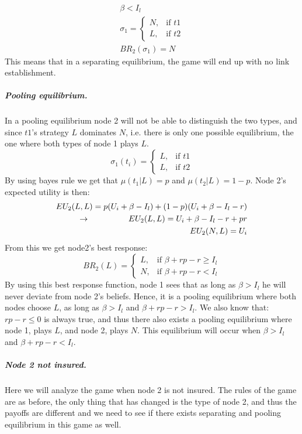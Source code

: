 \begin{eqnarray}
\beta<I_{l}\\
 \sigma_{1}= 
\begin{cases}
   N,& \text{if } t1\\
   L,& \text{if } t2  
\end{cases}\\
BR_{2}(\sigma_{1})=N
\end{eqnarray} 
This means that in a separating equilibrium, the game will end up with no link establishment.
\subparagraph{Pooling equilibrium.}
In a pooling equilibrium node 2 will not be able to distinguish the two types, and since $t1$'s strategy $L$ dominates $N$, i.e. there is only one possible equilibrium, the one where both types of node 1 plays $L$.
\begin{equation}
    \sigma_{1}(t_{i})= 
\begin{cases}
   L,& \text{if } t1\\
   L,& \text{if } t2  
\end{cases}
\label{eq:node2beliefpooling}
\end{equation}
By using bayes rule we get that $\mu(t_{1}|L)=p$ and $\mu(t_{2}|L)=1-p$.
Node 2's expected utility is then:
\begin{eqnarray}
EU_{2}(L,L)=p(U_{i}+\beta-I_{l})+(1-p)(U_{i}+\beta-I_{l}-r)\nonumber\\
\llap{$\rightarrow$\hspace{50pt}}EU_{2}(L,L)=U_{i}+\beta-I_{l}-r+pr\\
EU_{2}(N,L)=U_{i}
\end{eqnarray}
From this we get node2's best response:
\begin{equation}
BR_{2}(L)=
\begin{cases}
L ,& \text{if } \beta + rp-r\geq I_{l} \\
N ,& \text{if } \beta +rp -r < I_{l} 
\end{cases}
\end{equation}
By using this best response function, node 1 sees that as long as $\beta>I_{l}$ he will never deviate from node 2's beliefs. Hence, it is a pooling equilibrium where both nodes choose $L$, as long as $\beta>I_{l}$ and $\beta +rp-r>I_{l}$.
We also know that: $rp-r\leq0$ is always true, and thus there also exists a pooling equilibrium where node 1, plays $L$, and node 2, plays $N$. This equilibrium will occur when $\beta>I_{l}$ and $\beta+rp-r<I_{l}$.
\subparagraph{Node 2 not insured.}
Here we will analyze the game when node 2 is not insured.
The rules of the game are as before, the only thing that has changed is the type of node 2, and thus the payoffs are different and we need to see if there exists separating and pooling equilibrium in this game as well.
